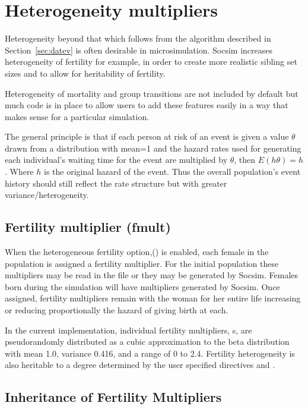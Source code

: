 \section{Heterogeneity multipliers}
\label{sec:hetero}

Heterogeneity beyond that which follows from the algorithm described
in Section~\ref{sec:datev} is
often desirable in microsimulation.  Socsim increases heterogeneity
of fertility for example, in order to create more realistic sibling
set sizes and to allow for heritability of fertility.  

Heterogeneity of mortality and group transitions are not included by
default but much code is in place to allow users to add these features
easily in a way that makes sense for a particular simulation.

The general principle is that if each person at risk of an event is
given a value $\theta$ drawn from a distribution with mean=1 and the
hazard rates used for generating each individual's waiting time for
the event are multiplied by $\theta$, then $E(h\theta)=h$.  Where $h$
is the original hazard of the event.  Thus the overall population's
event history should still reflect the rate structure but with greater
variance/heterogeneity.

\subsection{Fertility multiplier (fmult)}
\label{sec:fmult}

When the heterogeneous fertility option,()  is enabled,
each female in the population is assigned a fertility multiplier.
For the initial population these multipliers may be read in the
 file or they may be generated by Socsim.  Females born
during the simulation will have multipliers generated by Socsim.  Once
assigned, fertility multipliers remain with the woman for her entire
life increasing or reducing proportionally the hazard of giving birth
at each.

In the current implementation, individual fertility multipliers,
s, are pseudorandomly distributed as a cubic approximation to
the beta distribution with mean 1.0, variance 0.416, and a range of 0
to 2.4.  Fertility heterogeneity is also heritable to a degree determined by the user specified directives  and .

\subsection{Inheritance of Fertility Multipliers}
\label{sec:inheritancefert}

